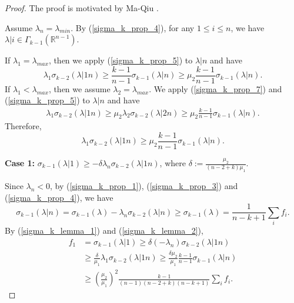 \documentclass[12pt]{amsart}
\theoremstyle{definition}
\theoremstyle{remark}
\numberwithin{equation}{section}
\begin{document}
\begin{proof}
	The proof is motivated by Ma-Qiu \cite{MaQiu19}.
	
	Assume $\lambda_n = \lambda_{min}$. By (\ref{sigma_k_prop_4}), for any $1 \leq i \leq n$, we have $\lambda|i \in \Gamma_{k-1}(\mathbb{R}^{n-1})$. 
	
	If $\lambda_1 = \lambda_{max}$, then we apply (\ref{sigma_k_prop_5}) to $\lambda|n$ and have
	\begin{equation}
	\lambda_1 \sigma_{k-2}(\lambda|1n) \geq \frac{k-1}{n-1}\sigma_{k-1}(\lambda|n) \geq \mu_2\frac{k-1}{n-1}\sigma_{k-1}(\lambda|n).
	\end{equation}
	If $\lambda_1 < \lambda_{max}$, then we assume $\lambda_2 = \lambda_{max}$. We apply (\ref{sigma_k_prop_7}) and (\ref{sigma_k_prop_5}) to $\lambda|n$ and have
	\begin{equation}
	\begin{aligned}
	\lambda_1 \sigma_{k-2}(\lambda|1n) \geq \mu_2 \lambda_2 \sigma_{k-2}(\lambda|2n) \geq \mu_2\frac{k-1}{n-1}\sigma_{k-1}(\lambda|n).
	\end{aligned}
	\end{equation}
	Therefore, 
	\begin{equation}\label{sigma_k_lemma_1}
	\lambda_1 \sigma_{k-2}(\lambda|1n) \geq \mu_2\frac{k-1}{n-1}\sigma_{k-1}(\lambda|n).
	\end{equation}
	
	{\bf Case 1:} $\sigma_{k-1}(\lambda|1) \geq - \delta \lambda_n \sigma_{k-2}(\lambda|1n)$, where $\delta := \frac{\mu_2}{(n-2+k)\mu_1}$.
	
	Since $\lambda_n < 0$, by (\ref{sigma_k_prop_1}), (\ref{sigma_k_prop_3}) and (\ref{sigma_k_prop_4}), we have
	\begin{equation}\label{sigma_k_lemma_2}
	\sigma_{k-1}(\lambda|n) = \sigma_{k-1}(\lambda) - \lambda_n \sigma_{k-2}(\lambda|n) \geq \sigma_{k-1}(\lambda) = \frac{1}{n-k+1}\sum_i f_i.
	\end{equation}
	By (\ref{sigma_k_lemma_1}) and (\ref{sigma_k_lemma_2}),
	\begin{equation}
	\begin{aligned}
	f_1 & = \sigma_{k-1}(\lambda|1) 
	\geq  \delta (-\lambda_n) \sigma_{k-2}(\lambda|1n) \\
	&\geq  \frac{\delta}{\mu_1} \lambda_1 \sigma_{k-2}(\lambda|1n) \geq  \frac{\delta\mu_2}{\mu_1} \frac{k-1}{n-1}\sigma_{k-1}(\lambda|n) \\
	&\geq \left( \frac{\mu_2}{\mu_1} \right)^2 \frac{k - 1}{(n-1)(n-2+k) (n-k+1)} \sum_i f_i.
	\end{aligned}
	\end{equation}
	

\end{proof}
\end{document}
